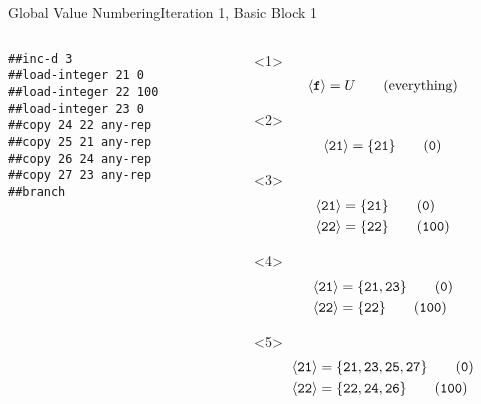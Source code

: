 \documentclass{beamer}
\newcommand{\vn}[1]{\ensuremath{\langle\texttt{#1}\rangle}}
\newcommand{\vreg}[1]{\texttt{#1}}
\begin{document}
\begin{frame}[fragile]{Global Value Numbering}{Iteration 1, Basic Block 1}
  \footnotesize
  \begin{columns}[t,onlytextwidth]
    \begin{column}[t]{.5\textwidth}
      \begin{Verbatim}[frame=single]
##inc-d 3
##load-integer 21 0
##load-integer 22 100
##load-integer 23 0
##copy 24 22 any-rep
##copy 25 21 any-rep
##copy 26 24 any-rep
##copy 27 23 any-rep
##branch
      \end{Verbatim}
    \end{column}
    \begin{column}{.5\textwidth}
      \begin{onlyenv}<1>
        \begin{align*}
          \vn{\textbf{f}} &= U \tag{everything} \\
        \end{align*}
      \end{onlyenv}
      \begin{onlyenv}<2>
        \begin{align*}
          \vn{21} &= \{\vreg{21}\} \tag{\texttt{0}} \\
        \end{align*}
      \end{onlyenv}
      \begin{onlyenv}<3>
        \begin{align*}
          \vn{21} &= \{\vreg{21}\} \tag{\texttt{0}}   \\
          \vn{22} &= \{\vreg{22}\} \tag{\texttt{100}} \\
        \end{align*}
      \end{onlyenv}
      \begin{onlyenv}<4>
        \begin{align*}
          \vn{21} &= \{\vreg{21},\vreg{23}\} \tag{\texttt{0}}   \\
          \vn{22} &= \{\vreg{22}\}           \tag{\texttt{100}} \\
        \end{align*}
      \end{onlyenv}
      \begin{onlyenv}<5>
        \begin{align*}
          \vn{21} &= \{\vreg{21}, \vreg{23}, \vreg{25}, \vreg{27}\} \tag{\texttt{0}}   \\
          \vn{22} &= \{\vreg{22}, \vreg{24}, \vreg{26}\}            \tag{\texttt{100}} \\
        \end{align*}
      \end{onlyenv}
    \end{column}
  \end{columns}
\end{frame}
\end{document}

